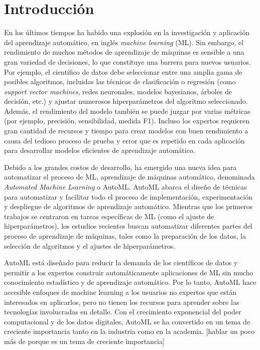 \chapter*{Introducción}\label{chapter:introduction}

\qquad 

En los últimos tiempos ha habido una explosión en la investigación y aplicación del aprendizaje automático, en inglés \textit{machine learning} (ML). Sin embargo, el rendimiento de muchos métodos de aprendizaje de máquinas es sensible a una gran variedad de decisiones, lo que constituye una barrera para nuevos usuarios. Por ejemplo, el científico de datos debe seleccionar entre una amplia gama de posibles algoritmos, incluidas las técnicas de clasificación o regresión (como \textit{support vector machines}, redes neuronales, modelos bayesianos, árboles de decisión, etc.) y ajustar numerosos hiperparámetros del algoritmo seleccionado. Además, el rendimiento del modelo también se puede juzgar por varias métricas (por ejemplo, precisión, sensibilidad, medida F1). Incluso los expertos requieren gran cantidad de recursos y tiempo para crear modelos con buen rendimiento a causa del tedioso proceso de prueba y error que es repetido en cada aplicación para desarrollar modelos eficientes de aprendizaje automático.

Debido a los grandes costos de desarrollo, ha emergido una nueva idea para automatizar el proceso de ML, aprendizaje de máquinas automático, denominada \textit{Automated Machine Learning} o AutoML. AutoML abarca el diseño de técnicas para automatizar y facilitar todo el proceso de implementación, experimentación y despliegue de algoritmos de aprendizaje automático. Mientras que los primeros trabajos se centraron en tareas específicas de ML (como el ajuste de hiperparámetros), los estudios recientes buscan automatizar diferentes partes del proceso de aprendizaje de máquinas, tales como la preparación de los datos, la selección de algoritmos y el ajustes de hiperparámetros.

AutoML está diseñado para reducir la demanda de los científicos de datos y permitir a los expertos construir automáticamente aplicaciones de ML sin mucho conocimiento estadístico y de aprendizaje automático. Por lo tanto, AutoML hace accesible enfoques de machine learning a los usuarios no expertos que están interesados en aplicarlos, pero no tienen los recursos para aprender sobre las tecnologías involucradas en detalle. Con el crecimiento exponencial del poder computacional y de los datos digitales, AutoML se ha convertido en un tema de creciente importancia tanto en la industria como en la academia. [hablar un poco más de porque es un tema de creciente importancia]

